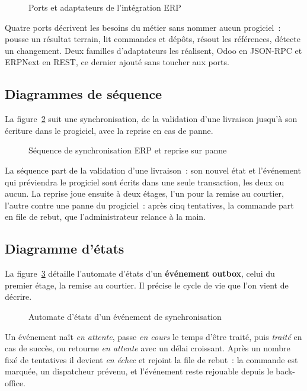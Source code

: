 \begin{figure}[H]
\centering
{}
\caption{Ports et adaptateurs de l'intégration ERP}
\label{fig:class-erp}
\end{figure}

Quatre ports décrivent les besoins du métier sans nommer aucun progiciel~:  pousse
un résultat terrain,  lit commandes et dépôts,  résout les
références,  détecte un changement. Deux familles d'adaptateurs les réalisent,
Odoo en JSON-RPC et ERPNext en REST, ce dernier ajouté sans toucher aux ports.

\subsection{Diagrammes de séquence}

La figure~\ref{fig:seq-erp} suit une synchronisation, de la validation d'une livraison jusqu'à son
écriture dans le progiciel, avec la reprise en cas de panne.

\begin{figure}[H]
\centering
{}
\caption{Séquence de synchronisation ERP et reprise sur panne}
\label{fig:seq-erp}
\end{figure}

La séquence part de la validation d'une livraison~: son nouvel état et l'événement qui préviendra le
progiciel sont écrits dans une seule transaction, les deux ou aucun. La reprise joue ensuite à deux
étages, l'un pour la remise au courtier, l'autre contre une panne du progiciel~: après cinq
tentatives, la commande part en file de rebut, que l'administrateur relance à la main.

\subsection{Diagramme d'états}

La figure~\ref{fig:etat-erp} détaille l'automate d'états d'un \textbf{événement outbox}, celui du
premier étage, la remise au courtier. Il précise le cycle de vie que l'on vient de décrire.

\begin{figure}[H]
\centering
{}
\caption{Automate d'états d'un événement de synchronisation}
\label{fig:etat-erp}
\end{figure}

Un événement naît \emph{en attente}, passe \emph{en cours} le temps d'être traité, puis
\emph{traité} en cas de succès, ou retourne \emph{en attente} avec un délai croissant. Après un
nombre fixé de tentatives il devient \emph{en échec} et rejoint la file de rebut~: la commande est
marquée, un dispatcheur prévenu, et l'événement reste rejouable depuis le back-office.

